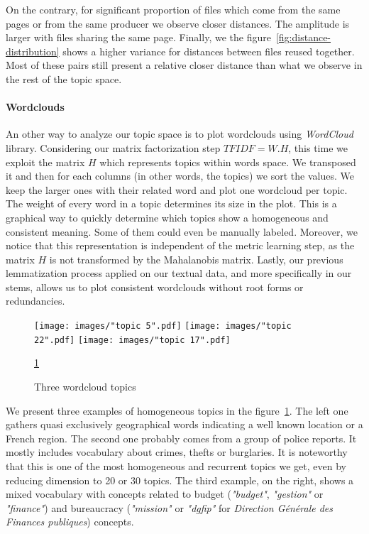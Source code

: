 \documentclass[a4paper]{article}
\begin{document}
	On the contrary, for significant proportion of files which come from the same pages or from the same producer we observe closer distances. The amplitude is larger with files sharing the same page. Finally, we the figure~\ref{fig:distance-distribution} shows a higher variance for distances between files reused together. Most of these pairs still present a relative closer distance than what we observe in the rest of the topic space.
	
	\paragraph{Wordclouds}
	
	An other way to analyze our topic space is to plot wordclouds using \emph{WordCloud} library. Considering our matrix factorization step $TFIDF = W.H$, this time we exploit the matrix $H$ which represents topics within words space. We transposed it and then for each columns (in other words, the topics) we sort the values. We keep the larger ones with their related word and plot one wordcloud per topic. The weight of every word in a topic determines its size in the plot. This is a graphical way to quickly determine which topics show a homogeneous and consistent meaning. Some of them could even be manually labeled. Moreover, we notice that this representation is independent of the metric learning step, as the matrix $H$ is not transformed by the Mahalanobis matrix. Lastly, our previous lemmatization process applied on our textual data, and more specifically in our stems, allows us to plot consistent wordclouds without root forms or redundancies.
	
	\begin{figure}[]
		\texttt{[image: images/"topic 5".pdf]}
		\label{fig:wc-region}
		\endminipage\hfill
		\texttt{[image: images/"topic 22".pdf]}
		\label{fig:wc-police}
		\endminipage\hfill
		\texttt{[image: images/"topic 17".pdf]}
		\label{fig:wc-budget}
		\endminipage
		\caption{Three wordcloud topics}
		\label{fig:wc}
		\ref{fig:wc}
	\end{figure}

	We present three examples of homogeneous topics in the figure~\ref{fig:wc}. The left one gathers quasi exclusively geographical words indicating a well known location or a French region. The second one probably comes from a group of police reports. It mostly includes vocabulary about crimes, thefts or burglaries. It is noteworthy that this is one of the most homogeneous and recurrent topics we get, even by reducing dimension to 20 or 30 topics. The third example, on the right, shows a mixed vocabulary with concepts related to budget (\textit{"budget"}, \textit{"gestion"} or \textit{"finance"}) and bureaucracy (\textit{"mission"} or \textit{"dgfip"} for \textit{Direction Générale des Finances publiques}) concepts.
\end{document}
